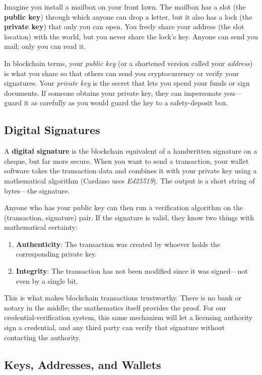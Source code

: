 Imagine you install a mailbox on your front lawn.  The mailbox has a slot
(the \textbf{public key}) through which anyone can drop a letter, but it also
has a lock (the \textbf{private key}) that only you can open.  You freely
share your address (the slot location) with the world, but you never share
the lock's key.  Anyone can send you mail; only you can read it.

In blockchain terms, your \emph{public key} (or a shortened version called
your \emph{address}) is what you share so that others can send you
cryptocurrency or verify your signatures.  Your \emph{private key} is the
secret that lets you spend your funds or sign documents.  If someone obtains
your private key, they can impersonate you---guard it as carefully as you
would guard the key to a safety-deposit box.

\subsection{Digital Signatures}

A \textbf{digital signature} is the blockchain equivalent of a handwritten
signature on a cheque, but far more secure.  When you want to send a
transaction, your wallet software takes the transaction data and combines it
with your private key using a mathematical algorithm (Cardano uses
\emph{Ed25519}).  The output is a short string of bytes---the signature.

Anyone who has your public key can then run a verification algorithm on the
(transaction, signature) pair.  If the signature is valid, they know two
things with mathematical certainty:

\begin{enumerate}
  \item \textbf{Authenticity}: The transaction was created by whoever holds
        the corresponding private key.
  \item \textbf{Integrity}: The transaction has not been modified since it
        was signed---not even by a single bit.
\end{enumerate}

This is what makes blockchain transactions trustworthy.  There is no bank or
notary in the middle; the mathematics itself provides the proof.  For our
credential-verification system, this same mechanism will let a licensing
authority sign a credential, and any third party can verify that signature
without contacting the authority.

\subsection{Keys, Addresses, and Wallets}

